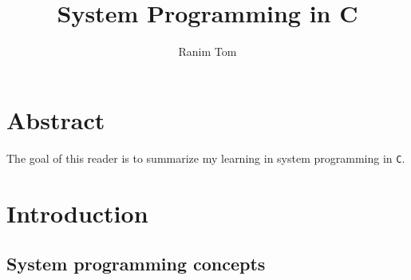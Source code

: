 \documentclass[12pt,a4paper]{book}
\title{System Programming in C}
\author{Ranim Tom}
\begin{document}
% 

\tableofcontents


\listoftodos

\pagestyle{fancy}
\fancyhf{} %
\rhead{\rightmark}

\chapter*{Abstract}

The goal of this reader is to summarize my learning in system programming in \verb|C|.

\chapter{Introduction}

\section{System programming concepts}
\end{document}
